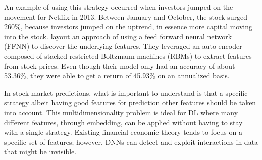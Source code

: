 \documentclass[11pt]{article}
\begin{document}
An example of using this strategy occurred when investors jumped on the movement for Netflix in 2013. Between January and October, the stock surged 260\%, because investors jumped on the uptrend, in essence more capital moving into the stock. \citet{Takeuchi2013ApplyingStocks} layout an approach of using a feed forward neural network (FFNN) to discover the underlying features. They leveraged an auto-encoder composed of stacked restricted Boltzmann machines (RBMs) to extract features from stock prices. Even though their model only had an accuracy of about  53.36\%, they were able to get a return of 45.93\% on an annualized basis.

In stock market predictions, what is important to understand is that a specific strategy albeit having good features for prediction other features should be taken into account. This multidimensionality problem is ideal for DL where many different features, through embedding, can be applied without having to stay with a single strategy. Existing financial economic theory tends to focus on a specific set of features; however, DNNs can detect and exploit interactions in data that might be invisible.

\end{document}
